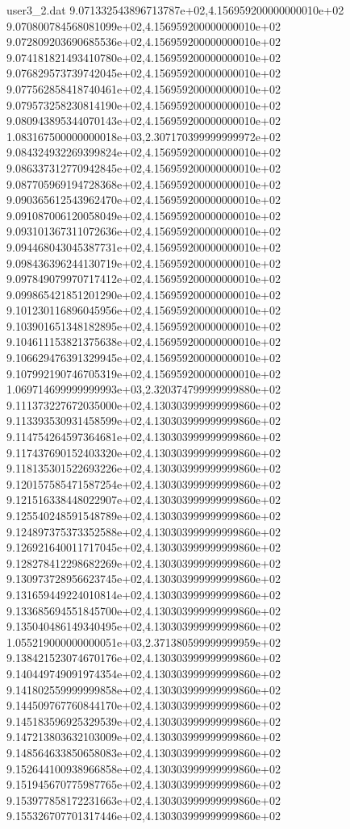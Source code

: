 \begin{filecontents}{user3_2.dat}
9.071332543896713787e+02,4.156959200000000010e+02
9.070800784568081099e+02,4.156959200000000010e+02
9.072809203690685536e+02,4.156959200000000010e+02
9.074181821493410780e+02,4.156959200000000010e+02
9.076829573739742045e+02,4.156959200000000010e+02
9.077562858418740461e+02,4.156959200000000010e+02
9.079573258230814190e+02,4.156959200000000010e+02
9.080943895344070143e+02,4.156959200000000010e+02
1.083167500000000018e+03,2.307170399999999972e+02
9.084324932269399824e+02,4.156959200000000010e+02
9.086337312770942845e+02,4.156959200000000010e+02
9.087705969194728368e+02,4.156959200000000010e+02
9.090365612543962470e+02,4.156959200000000010e+02
9.091087006120058049e+02,4.156959200000000010e+02
9.093101367311072636e+02,4.156959200000000010e+02
9.094468043045387731e+02,4.156959200000000010e+02
9.098436396244130719e+02,4.156959200000000010e+02
9.097849079970717412e+02,4.156959200000000010e+02
9.099865421851201290e+02,4.156959200000000010e+02
9.101230116896045956e+02,4.156959200000000010e+02
9.103901651348182895e+02,4.156959200000000010e+02
9.104611153821375638e+02,4.156959200000000010e+02
9.106629476391329945e+02,4.156959200000000010e+02
9.107992190746705319e+02,4.156959200000000010e+02
1.069714699999999993e+03,2.320374799999999880e+02
9.111373227672035000e+02,4.130303999999999860e+02
9.113393530931458599e+02,4.130303999999999860e+02
9.114754264597364681e+02,4.130303999999999860e+02
9.117437690152403320e+02,4.130303999999999860e+02
9.118135301522693226e+02,4.130303999999999860e+02
9.120157585471587254e+02,4.130303999999999860e+02
9.121516338448022907e+02,4.130303999999999860e+02
9.125540248591548789e+02,4.130303999999999860e+02
9.124897375373352588e+02,4.130303999999999860e+02
9.126921640011717045e+02,4.130303999999999860e+02
9.128278412298682269e+02,4.130303999999999860e+02
9.130973728956623745e+02,4.130303999999999860e+02
9.131659449224010814e+02,4.130303999999999860e+02
9.133685694551845700e+02,4.130303999999999860e+02
9.135040486149340495e+02,4.130303999999999860e+02
1.055219000000000051e+03,2.371380599999999959e+02
9.138421523074670176e+02,4.130303999999999860e+02
9.140449749091974354e+02,4.130303999999999860e+02
9.141802559999999858e+02,4.130303999999999860e+02
9.144509767760844170e+02,4.130303999999999860e+02
9.145183596925329539e+02,4.130303999999999860e+02
9.147213803632103009e+02,4.130303999999999860e+02
9.148564633850658083e+02,4.130303999999999860e+02
9.152644100938966858e+02,4.130303999999999860e+02
9.151945670775987765e+02,4.130303999999999860e+02
9.153977858172231663e+02,4.130303999999999860e+02
9.155326707701317446e+02,4.130303999999999860e+02

\end{filecontents}
